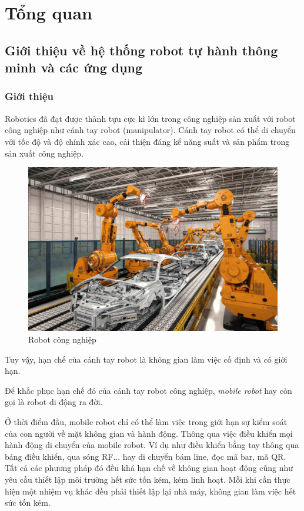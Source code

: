 \chapter{Tổng quan}
\section{Giới thiệu về hệ thống robot tự hành thông minh và các ứng dụng}
\subsection{Giới thiệu}

Robotics đã đạt được thành tựu cực kì lớn trong công nghiệp sản xuất với robot công nghiệp như cánh tay robot (manipulator). Cánh tay robot có thể di chuyển với tốc độ và độ chính xác cao, cải thiện đáng kể năng suất và sản phẩm trong sản xuất công nghiệp.
\cite{siegwart2011introduction}

\begin{figure}[h]
    \centering
    \includegraphics[width=13cm]{chapter1/figs/IndustrialRobot.jpg}
    \caption{Robot công nghiệp}
\end{figure}

Tuy vậy, hạn chế của cánh tay robot là không gian làm việc cố định và có giới hạn.

Để khắc phục hạn chế đó của cánh tay robot công nghiệp, \textit{mobile robot} hay còn gọi là robot di động ra đời. 

Ở thời điểm đầu, mobile robot chỉ có thể làm việc trong giới hạn sự kiểm soát của con người về mặt không gian và hành động. Thông qua việc điều khiển mọi hành động di chuyển của mobile robot. Ví dụ như điều khiển bằng tay thông qua bảng điều khiển, qua sóng RF... hay di chuyển bám line, đọc mã bar, mã QR. Tất cả các phương pháp đó đều khá hạn chế về không gian hoạt động cũng như yêu cầu thiết lập môi trường hết sức tốn kém, kém linh hoạt. Mỗi khi cần thực hiện một nhiệm vụ khác đều phải thiết lập lại nhà máy, không gian làm việc hết sức tốn kém.

